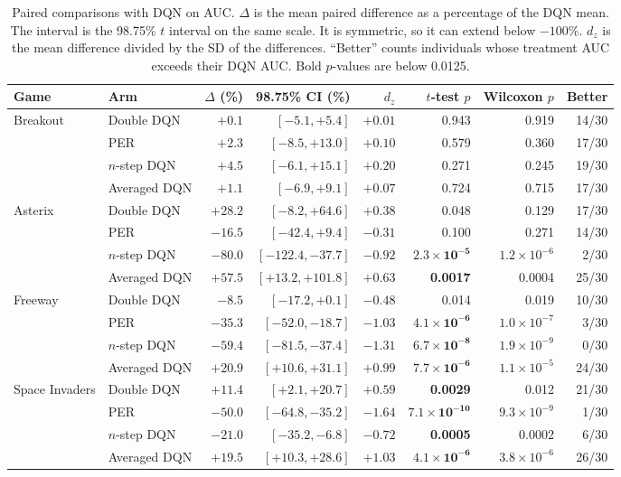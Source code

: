 \documentclass[11pt,a4paper]{article}
\begin{document}
\begin{table}[htbp]
    \centering
    \caption{Paired comparisons with DQN on AUC. $\Delta$ is the mean
    paired difference as a percentage of the DQN mean. The interval is the
    98.75\% $t$ interval on the same scale. It is symmetric, so it can extend
    below $-100\%$. $d_z$ is the mean difference divided by the SD of the
    differences. ``Better'' counts individuals whose treatment AUC exceeds
    their DQN AUC. Bold $p$-values are below 0.0125.}
    \label{tab:paired}
    \small
    \begin{tabular}{llrrrrrr}
        \toprule
        Game & Arm & $\Delta$ (\%) & 98.75\% CI (\%) & $d_z$ & $t$-test $p$ & Wilcoxon $p$ & Better \\
        \midrule
        Breakout & Double DQN & $+0.1$ & $[-5.1, +5.4]$ & $+0.01$ & 0.943 & 0.919 & 14/30 \\
         & PER & $+2.3$ & $[-8.5, +13.0]$ & $+0.10$ & 0.579 & 0.360 & 17/30 \\
         & $n$-step DQN & $+4.5$ & $[-6.1, +15.1]$ & $+0.20$ & 0.271 & 0.245 & 19/30 \\
         & Averaged DQN & $+1.1$ & $[-6.9, +9.1]$ & $+0.07$ & 0.724 & 0.715 & 17/30 \\
        \midrule
        Asterix & Double DQN & $+28.2$ & $[-8.2, +64.6]$ & $+0.38$ & 0.048 & 0.129 & 17/30 \\
         & PER & $-16.5$ & $[-42.4, +9.4]$ & $-0.31$ & 0.100 & 0.271 & 14/30 \\
         & $n$-step DQN & $-80.0$ & $[-122.4, -37.7]$ & $-0.92$ & $\mathbf{2.3\times10^{-5}}$ & $1.2\times10^{-6}$ & 2/30 \\
         & Averaged DQN & $+57.5$ & $[+13.2, +101.8]$ & $+0.63$ & \textbf{0.0017} & 0.0004 & 25/30 \\
        \midrule
        Freeway & Double DQN & $-8.5$ & $[-17.2, +0.1]$ & $-0.48$ & 0.014 & 0.019 & 10/30 \\
         & PER & $-35.3$ & $[-52.0, -18.7]$ & $-1.03$ & $\mathbf{4.1\times10^{-6}}$ & $1.0\times10^{-7}$ & 3/30 \\
         & $n$-step DQN & $-59.4$ & $[-81.5, -37.4]$ & $-1.31$ & $\mathbf{6.7\times10^{-8}}$ & $1.9\times10^{-9}$ & 0/30 \\
         & Averaged DQN & $+20.9$ & $[+10.6, +31.1]$ & $+0.99$ & $\mathbf{7.7\times10^{-6}}$ & $1.1\times10^{-5}$ & 24/30 \\
        \midrule
        Space Invaders & Double DQN & $+11.4$ & $[+2.1, +20.7]$ & $+0.59$ & \textbf{0.0029} & 0.012 & 21/30 \\
         & PER & $-50.0$ & $[-64.8, -35.2]$ & $-1.64$ & $\mathbf{7.1\times10^{-10}}$ & $9.3\times10^{-9}$ & 1/30 \\
         & $n$-step DQN & $-21.0$ & $[-35.2, -6.8]$ & $-0.72$ & \textbf{0.0005} & 0.0002 & 6/30 \\
         & Averaged DQN & $+19.5$ & $[+10.3, +28.6]$ & $+1.03$ & $\mathbf{4.1\times10^{-6}}$ & $3.8\times10^{-6}$ & 26/30 \\
        \bottomrule
    \end{tabular}
\end{table}
\end{document}
